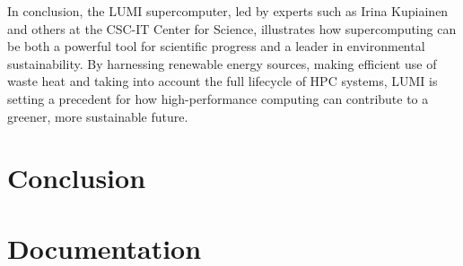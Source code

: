 \documentclass[12pt,oneside]{book} %
\begin{document}
In conclusion, the LUMI supercomputer, led by experts such as Irina Kupiainen
and others at the CSC-IT Center for Science, illustrates how supercomputing can
be both a powerful tool for scientific progress and a leader in environmental
sustainability. By harnessing renewable energy sources, making efficient use of
waste heat and taking into account the full lifecycle of HPC systems, LUMI is
setting a precedent for how high-performance computing can contribute to a
greener, more sustainable future.

\chapter{Conclusion}




\appendix
\chapter{Documentation}
\end{document}
